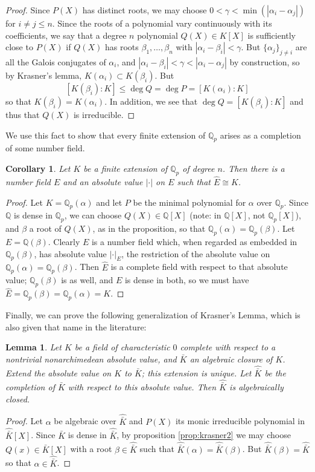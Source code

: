 \documentclass[12pt]{article}
\newcommand{\BQ}{\mathbb{Q}}
\newcommand{\Abs}[1]{\left\lvert #1\right\rvert}
\newtheorem{cor}[thm]{Corollary}
\newtheorem{lem}[thm]{Lemma}
\begin{document}
\begin{proof} Since $P(X)$ has distinct roots, we may choose $0 < \gamma < \min(\Abs{\alpha_i - \alpha_j})$ for $i\neq j \leq n$. Since the roots of a polynomial vary continuously with its coefficients, we say that a degree $n$ polynomial $Q(X)\in K[X]$ is sufficiently close to $P(X)$ if $Q(X)$ has roots $\beta_1,\dotsc,\beta_n$ with $\Abs{\alpha_i-\beta_i} < \gamma$. But $\{\alpha_j\}_{j\neq i}$ are all the Galois conjugates of $\alpha_i$, and $\Abs{\alpha_i - \beta_i} < \gamma < \Abs{\alpha_i - \alpha_j}$ by construction, so by Krasner's lemma, $K(\alpha_i) \subset K(\beta_i)$. But
\[
  [K(\beta_i):K] \leq \deg Q = \deg P = [K(\alpha_i):K]
\]
so that $K(\beta_i) = K(\alpha_i)$. In addition, we see that $\deg Q = [K(\beta_i):K]$ and thus that $Q(X)$ is irreducible.
\end{proof}

We use this fact to show that every finite extension of $\BQ_p$ arises as a completion of some number field.
\begin{cor} Let $K$ be a finite extension of $\BQ_p$ of degree $n$. Then there is a number field $E$ and an absolute value $\Abs{\cdot}$ on $E$ such that $\hat{E}\cong K$.
\end{cor}
\begin{proof} Let $K=\BQ_p(\alpha)$ and let $P$ be the minimal polynomial for $\alpha$ over $\BQ_p$. Since $\BQ$ is dense in $\BQ_p$, we can choose $Q(X)\in\BQ[X]$ (note: in $\BQ[X]$, not $\BQ_p[X]$), and $\beta$ a root of $Q(X)$, as in the proposition, so that $\BQ_p(\alpha)=\BQ_p(\beta)$. Let $E=\BQ(\beta)$. Clearly $E$ is a number field which, when regarded as embedded in $\BQ_p(\beta)$, has absolute value $\Abs{\cdot}_E$, the restriction of the absolute value on $\BQ_p(\alpha)=\BQ_p(\beta)$. Then $\hat{E}$ is a complete field with respect to that absolute value; $\BQ_p(\beta)$ is as well, and $E$ is dense in both, so we must have $\hat{E}=\BQ_p(\beta)=\BQ_p(\alpha)=K$.
\end{proof}

Finally, we can prove the following generalization of Krasner's Lemma, which is also given that name in the literature:
\begin{lem} Let $K$ be a field of characteristic $0$ complete with respect to a nontrivial nonarchimedean absolute value, and $\bar{K}$ an algebraic closure of $K$. Extend the absolute value on $K$ to $\bar{K}$; this extension is unique. Let $\hat{\bar{K}}$ be the completion of $\bar{K}$ with respect to this absolute value. Then $\hat{\bar{K}}$ is algebraically closed.
\end{lem}

\begin{proof} Let $\alpha$ be algebraic over $\hat{\bar{K}}$ and $P(X)$ its monic irreducible polynomial in $\hat{\bar{K}}[X]$. Since $\bar{K}$ is dense in $\hat{\bar{K}}$, by proposition \ref{prop:krasner2} we may choose $Q(x)\in\bar{K}[X]$ with a root $\beta\in\hat{\bar{K}}$ such that $\hat{\bar{K}}(\alpha) = \hat{\bar{K}}(\beta)$. But $\hat{\bar{K}}(\beta) = \hat{\bar{K}}$ so that $\alpha\in\hat{\bar{K}}$.
\end{proof}

\end{document}
